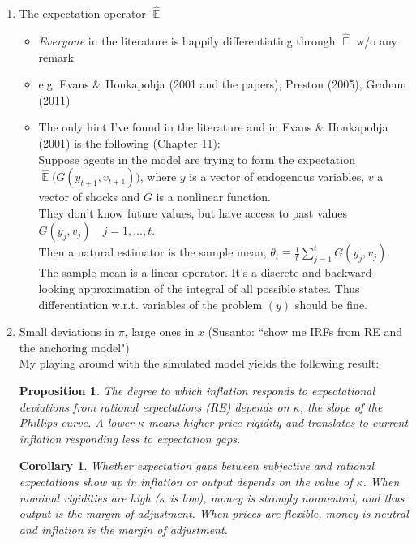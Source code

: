 \documentclass[11pt]{article}
\renewcommand{\[}{\begin{equation}}
\renewcommand{\]}{\end{equation}}
\newtheorem{prop}{Proposition}
\newtheorem{corollary}{Corollary}
\DeclareMathOperator{\E}{\mathbb{E}}
\begin{document}
\begin{enumerate}
\item The expectation operator $\hat{\E}$
	\begin{itemize}
	\item \emph{Everyone} in the literature is happily differentiating through $\hat{\E}$ w/o any remark
	\item[] e.g. Evans \& Honkapohja (2001 and the papers), Preston (2005), Graham (2011)
	\item The only hint I've found in the literature and in  Evans \& Honkapohja (2001) is the following (Chapter 11): \\
	Suppose agents in the model are trying to form the expectation $\hat{\E}\big(G(y_{t+1},v_{t+1}) \big)$, where $y$ is a vector of  endogenous variables, $v$ a vector of shocks and $G$ is a nonlinear function.\\
	They don't know future values, but have access to past values $G(y_{j},v_{j}) \quad j=1,\dots,t$. \\
	Then a natural estimator is the sample mean, $\theta_t \equiv \frac{1}{t} \sum_{j=1}^t G(y_{j},v_{j}) $. \\
	The sample mean is a linear operator. It's a discrete and backward-looking approximation of the integral of all possible states. Thus differentiation w.r.t. variables of the problem $(y)$ should be fine.
	\end{itemize}
\item Small deviations in $\pi$, large ones in $x$ (Susanto: ``show me IRFs from RE and the anchoring model")\\
My playing around with the simulated model yields the following result: 
	\begin{prop} The degree to which inflation responds to expectational deviations from rational expectations (RE) depends on $\kappa$, the slope of the Phillips curve. A lower $\kappa$ means higher price rigidity and translates to current inflation responding less to expectation gaps.
	\end{prop}
	\begin{corollary}Whether expectation gaps between subjective and rational expectations show up in inflation or output depends on the value of $\kappa$. When nominal rigidities are high ($\kappa$ is low), money is strongly nonneutral, and thus output is the margin of adjustment. When prices are flexible, money is neutral and inflation is the margin of adjustment. 
	\end{corollary}
	

\end{enumerate}
\end{document}
